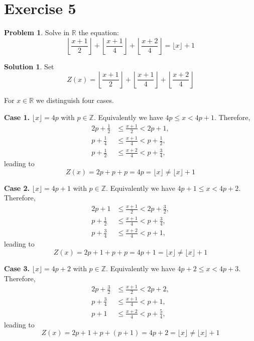 \documentclass{article}
\theoremstyle{definition}
\newtheorem{problem}{Problem}
\newtheorem*{solution}{Solution}
\begin{document}
\section*{Exercise 5}

\begin{problem}
Solve in $\mathbb{R}$ the equation:
\[
\left\lfloor \frac{x + 1}{2} \right\rfloor + \left\lfloor \frac{x + 1}{4} \right\rfloor + \left\lfloor \frac{x + 2}{4} \right\rfloor = \lfloor x \rfloor + 1
\]
\end{problem}

\begin{solution}
Set
\[
Z(x) = \left\lfloor \frac{x + 1}{2} \right\rfloor + \left\lfloor \frac{x + 1}{4} \right\rfloor + \left\lfloor \frac{x + 2}{4} \right\rfloor
\]

For $x \in \mathbb{R}$ we distinguish four cases.

\textbf{Case 1.} $\lfloor x \rfloor = 4p$ with $p \in \mathbb{Z}$. Equivalently we have $4p \leq x < 4p + 1$. Therefore,
\begin{align*}
2p + \frac{1}{2} &\leq \frac{x + 1}{2} < 2p + 1, \\
p + \frac{1}{4} &\leq \frac{x + 1}{4} < p + \frac{1}{2}, \\
p + \frac{1}{2} &\leq \frac{x + 2}{4} < p + \frac{3}{4},
\end{align*}
leading to
\[
Z(x) = 2p + p + p = 4p = \lfloor x \rfloor \neq \lfloor x \rfloor + 1
\]

\textbf{Case 2.} $\lfloor x \rfloor = 4p + 1$ with $p \in \mathbb{Z}$. Equivalently we have $4p + 1 \leq x < 4p + 2$. Therefore,
\begin{align*}
2p + 1 &\leq \frac{x + 1}{2} < 2p + \frac{3}{2}, \\
p + \frac{1}{2} &\leq \frac{x + 1}{4} < p + \frac{3}{4}, \\
p + \frac{3}{4} &\leq \frac{x + 2}{4} < p + 1,
\end{align*}
leading to
\[
Z(x) = 2p + 1 + p + p = 4p + 1 = \lfloor x \rfloor \neq \lfloor x \rfloor + 1
\]

\textbf{Case 3.} $\lfloor x \rfloor = 4p + 2$ with $p \in \mathbb{Z}$. Equivalently we have $4p + 2 \leq x < 4p + 3$. Therefore,
\begin{align*}
2p + \frac{3}{2} &\leq \frac{x + 1}{2} < 2p + 2, \\
p + \frac{3}{4} &\leq \frac{x + 1}{4} < p + 1, \\
p + 1 &\leq \frac{x + 2}{4} < p + \frac{5}{4},
\end{align*}
leading to
\[
Z(x) = 2p + 1 + p + (p + 1) = 4p + 2 = \lfloor x \rfloor \neq \lfloor x \rfloor + 1
\]


\end{solution}
\end{document}
